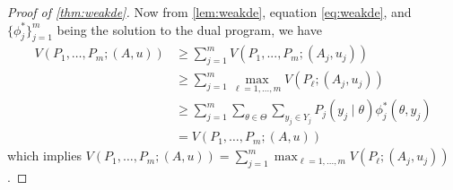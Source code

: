 \documentclass[11pt]{article}
\theoremstyle{plain}
\theoremstyle{remark}
\begin{document}
\begin{proof}[Proof of \autoref{thm:weakde}]
Now from \autoref{lem:weakde}, equation \eqref{eq:weakde}, and $\{\phi_j^*\}_{j=1}^m$ being the solution to the dual program, we have
\begin{align*}
    V(P_1, \ldots , P_m; (A,u))&\geq \sum_{j=1}^{m} V(P_1,...,P_m; (A_j,u_j))\\
    &\geq \sum_{j=1}^m\max_{\ell=1,...,m} V(P_\ell;(A_j,u_j))\\
    &\geq \sum_{j=1}^{m}\sum_{\theta\in\Theta}\sum_{y_j \in Y_j} P_j(y_j \mid \theta) \phi_j^*(\theta, y_j)\\
    &= V(P_1, \ldots , P_m; (A,u))
\end{align*}
which implies $V(P_1, \ldots , P_m; (A,u))=\sum_{j=1}^m\max_{\ell=1,...,m} V(P_\ell;(A_j,u_j))$.





\end{proof}
\end{document}

